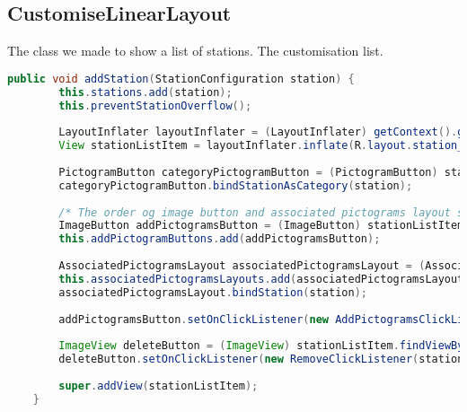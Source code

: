\subsection*{CustomiseLinearLayout}
The class we made to show a list of stations. The customisation list.

\begin{lstlisting}[language=java,firstnumber=1,caption={The method to add a station to the list},label=lst:addstation]
public void addStation(StationConfiguration station) {
        this.stations.add(station);
        this.preventStationOverflow();
        
        LayoutInflater layoutInflater = (LayoutInflater) getContext().getSystemService(Context.LAYOUT_INFLATER_SERVICE);
        View stationListItem = layoutInflater.inflate(R.layout.station_list_item, null);
        
        PictogramButton categoryPictogramButton = (PictogramButton) stationListItem.findViewById(R.id.list_category);
        categoryPictogramButton.bindStationAsCategory(station);
        
        /* The order og image button and associated pictograms layout statements, are very important here */
        ImageButton addPictogramsButton = (ImageButton) stationListItem.findViewById(R.id.addPictogramButton);
        this.addPictogramButtons.add(addPictogramsButton);
        
        AssociatedPictogramsLayout associatedPictogramsLayout = (AssociatedPictogramsLayout) stationListItem.findViewById(R.id.associatedPictograms);
        this.associatedPictogramsLayouts.add(associatedPictogramsLayout);
        associatedPictogramsLayout.bindStation(station);
        
        addPictogramsButton.setOnClickListener(new AddPictogramsClickListener(associatedPictogramsLayout));
        
        ImageView deleteButton = (ImageView) stationListItem.findViewById(R.id.deleteRowButton);
        deleteButton.setOnClickListener(new RemoveClickListener(station));
        
        super.addView(stationListItem);
    }
\end{lstlisting}
\begin{description}
\item[]
\end{description}

